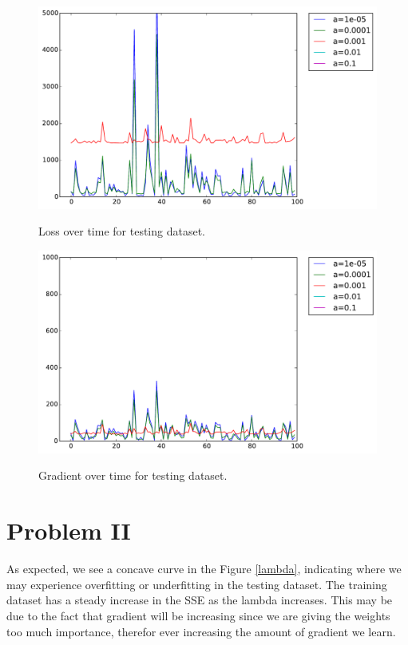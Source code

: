 \documentclass{article}
\begin{document}
    \begin{figure}[h]
      \begin{center}
      \includegraphics[scale=0.7]{testingLoss.pdf}\\
      \end{center}
      \caption{Loss over time for testing dataset.}
      \label{testingLoss}
    \end{figure}
    
    \begin{figure}[h]
      \begin{center}
      \includegraphics[scale=0.7]{testingGradient.pdf}\\
      \end{center}
      \caption{Gradient over time for testing dataset.}
      \label{testingGradient}
    \end{figure}

\section*{Problem II}
As expected, we see a concave curve in the Figure \ref{lambda}, indicating where we may experience overfitting or underfitting in the testing dataset. The training dataset has a steady increase in the SSE as the lambda increases. This may be due to the fact that gradient will be increasing since we are giving the weights too much importance, therefor ever increasing the amount of gradient we learn.
    
\end{document}
